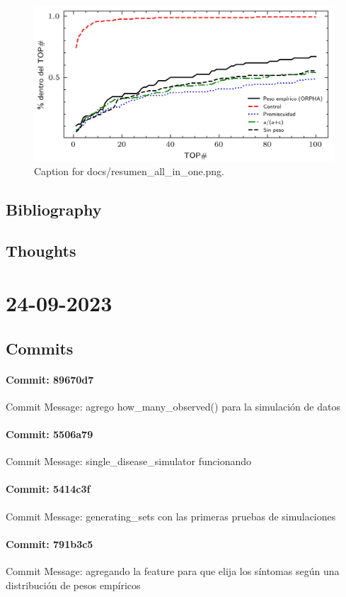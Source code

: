 \documentclass{article}
\begin{document}
\begin{figure}[h] \centering \includegraphics{docs/resumen_all_in_one.png} \caption{Caption for docs/resumen_all_in_one.png.} \end{figure}
\subsection{Bibliography}
\subsection{Thoughts}

\section{24-09-2023}
\subsection{Commits}
\paragraph{Commit: 89670d7}
Commit Message: agrego how_many_observed() para la simulación de datos

\paragraph{Commit: 5506a79}
Commit Message: single_disease_simulator funcionando

\paragraph{Commit: 5414c3f}
Commit Message: generating_sets con las primeras pruebas de simulaciones

\paragraph{Commit: 791b3c5}
Commit Message: agregando la feature para que elija los síntomas según una distribución de pesos empíricos
\end{document}

